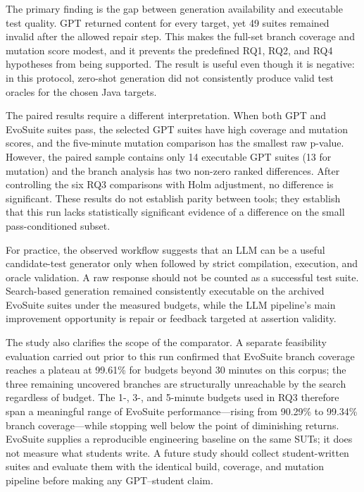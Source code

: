 ﻿\documentclass[conference]{IEEEtran}
\begin{document}
The primary finding is the gap between generation availability and executable test quality. GPT returned content for every target, yet 49 suites remained invalid after the allowed repair step. This makes the full-set branch coverage and mutation score modest, and it prevents the predefined RQ1, RQ2, and RQ4 hypotheses from being supported. The result is useful even though it is negative: in this protocol, zero-shot generation did not consistently produce valid test oracles for the chosen Java targets.

The paired results require a different interpretation. When both GPT and EvoSuite suites pass, the selected GPT suites have high coverage and mutation scores, and the five-minute mutation comparison has the smallest raw p-value. However, the paired sample contains only 14 executable GPT suites (13 for mutation) and the branch analysis has two non-zero ranked differences. After controlling the six RQ3 comparisons with Holm adjustment, no difference is significant. These results do not establish parity between tools; they establish that this run lacks statistically significant evidence of a difference on the small pass-conditioned subset.

For practice, the observed workflow suggests that an LLM can be a useful candidate-test generator only when followed by strict compilation, execution, and oracle validation. A raw response should not be counted as a successful test suite. Search-based generation remained consistently executable on the archived EvoSuite suites under the measured budgets, while the LLM pipeline's main improvement opportunity is repair or feedback targeted at assertion validity.

The study also clarifies the scope of the comparator. A separate feasibility evaluation carried out prior to this run confirmed that EvoSuite branch coverage reaches a plateau at 99.61\% for budgets beyond 30 minutes on this corpus; the three remaining uncovered branches are structurally unreachable by the search regardless of budget. The 1-, 3-, and 5-minute budgets used in RQ3 therefore span a meaningful range of EvoSuite performance---rising from 90.29\% to 99.34\% branch coverage---while stopping well below the point of diminishing returns. EvoSuite supplies a reproducible engineering baseline on the same SUTs; it does not measure what students write. A future study should collect student-written suites and evaluate them with the identical build, coverage, and mutation pipeline before making any GPT--student claim.
\end{document}
